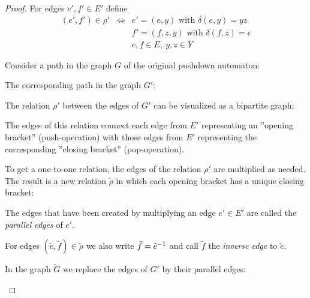 \begin{proof}
For edges $e', f' \in E'$ define
\begin{eqnarray*}
(e', f') \in \rho' & \iff & e' = (e, y)\text{ with }\delta(e, y) =
y z \\
&& f' = (f, z, y)\text{ with }\delta(f, z) = \epsilon \\
&& e, f \in E,\ y,z \in Y
\end{eqnarray*} 

Consider a path in the graph $G$ of the original pushdown automaton:

\begin{center}

\end{center}

The corresponding path in the graph $G'$:

\begin{center}

\end{center}

The relation $\rho'$ between the edges of $G'$ can be visualized as a bipartite
graph:

\begin{center}

\end{center}

The edges of this relation connect each edge from $E'$ representing an 
''opening bracket'' (push-operation) with those edges from $E'$
representing the corresponding ''closing bracket'' (pop-operation).

To get a one-to-one relation, the edges of the relation $\rho'$ are multiplied
as needed. The result is a new relation $\tilde{\rho}$ in which each
opening bracket has a unique closing bracket:

\begin{center}

\end{center}

The edges that have been created by multiplying an edge $e' \in E'$ are called
the {\em parallel edges} of $e'$.

For edges $(\tilde{e}, \tilde f) \in \tilde{\rho}$ we also write $\tilde f =
\mbox{${\tilde e}^{-1}$}$ and call $\tilde f$ the {\em inverse edge} to $\tilde e$.

In the graph $\tilde{G}$ we replace the edges of $G'$ by their parallel edges:

\begin{center}

\end{center}


\end{proof}

